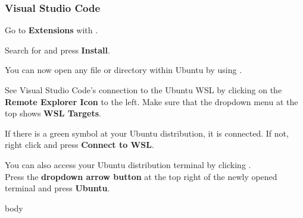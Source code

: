 \subsubsection{Visual Studio Code}


Go to \textbf{Extensions} with .

Search for  and press \textbf{Install}.

You can now open any file or directory within Ubuntu by using .

See Visual Studio Code's connection to the Ubuntu WSL by clicking on the \textbf{Remote Explorer Icon} to the left. Make sure that the dropdown menu at the top shows \textbf{WSL Targets}.

If there is a green symbol at your Ubuntu distribution, it is connected. If not,\\right click and press \textbf{Connect to WSL}.

You can also access your Ubuntu distribution terminal by clicking .\\
Press the \textbf{dropdown arrow button} at the top right of the newly opened terminal and press \textbf{Ubuntu}.

\ifdefined\wslRelevantVscodeCProgramming
{body}
\fi